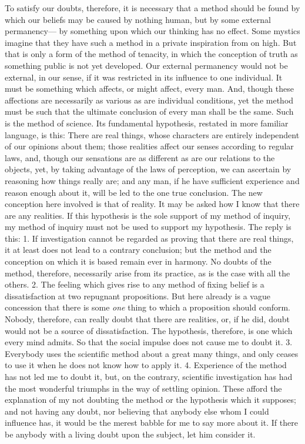 \documentclass[]{article}
\begin{document}
To satisfy our doubts, therefore, it is necessary that a method should be found by which our beliefs may be caused by nothing human, but by some external permanency--- by something upon which our thinking has no effect. Some mystics imagine that they have such a method in a private inspiration from on high. But that is only a form of the method of tenacity, in which the conception of truth as something public is not yet developed. Our external permanency would not be external, in our sense, if it was restricted in its influence to one individual. It must be something which affects, or might affect, every man. And, though these affections are necessarily as various as are individual conditions, yet the method must be such that the ultimate conclusion of every man shall be the same. Such is the method of science. Its fundamental hypothesis, restated in more familiar language, is this: There are real things, whose characters are entirely independent of our opinions about them; those realities affect our senses according to regular laws, and, though our sensations are as different as are our relations to the objects, yet, by taking advantage of the laws of perception, we can ascertain by reasoning how things really are; and any man, if he have sufficient experience and reason enough about it, will be led to the one true conclusion. The new conception here involved is that of reality. It may be asked how I know that there are any realities. If this hypothesis is the sole support of my method of inquiry, my method of inquiry must not be used to support my hypothesis. The reply is this: 1. If investigation cannot be regarded as proving that there are real things, it at least does not lead to a contrary conclusion; but the method and the conception on which it is based remain ever in harmony. No doubts of the method, therefore, necessarily arise from its practice, as is the case with all the others. 2. The feeling which gives rise to any method of fixing belief is a dissatisfaction at two repugnant propositions. But here already is a vague concession that there is some \emph{one} thing to which a proposition should conform.  Nobody, therefore, can really doubt that there are realities, or, if he did, doubt would not be a source of dissatisfaction. The hypothesis, therefore, is one which every mind admits. So that the social impulse does not cause me to doubt it. 3. Everybody uses the scientific method about a great many things, and only ceases to use it when he does not know how to apply it. 4. Experience of the method has not led me to doubt it, but, on the contrary, scientific investigation has had the most wonderful triumphs in the way of settling opinion. These afford the explanation of my not doubting the method or the hypothesis which it supposes; and not having any doubt, nor believing that anybody else whom I could influence has, it would be the merest babble for me to say more about it. If there be anybody with a living doubt upon the subject, let him consider it.
\end{document}
